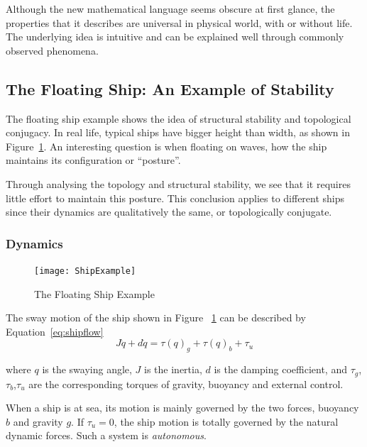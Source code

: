 Although the new mathematical language seems obscure at first glance, the properties that it describes are universal in physical world, with or without life.
The underlying idea is intuitive and can be explained well through commonly observed phenomena.



\subsection{The Floating Ship: An Example of Stability}
The floating ship  example shows the idea of structural stability and topological conjugacy.
In real life, typical ships have bigger height than width, as shown in Figure~\ref{fig:ShipFloating}.
An interesting  question is when floating on  waves, how the ship maintains its configuration or ``posture''.

Through analysing the topology and structural stability, we see that it requires little effort to maintain this posture.
This conclusion applies to different ships since their dynamics are qualitatively the same, or topologically conjugate.


\subsubsection*{Dynamics}

\begin{figure}[!htbp]
  \begin{center}
    \texttt{[image: ShipExample]}
    \caption{The Floating Ship Example}
    \label{fig:ShipFloating}
  \end{center}
\end{figure}

The sway motion of the ship shown in Figure ~\ref{fig:ShipFloating} can be described by Equation~\ref{eq:shipflow}
\begin{equation}
\label{eq:shipflow}
J\ddot{q}+d\dot{q}=\tau(q)_{g}+\tau(q)_{b}+\tau_{u}
\end{equation}


where $q$ is the swaying angle,
$J$ is the inertia,  
$d$ is the damping coefficient,
and $\tau_{g}$,$\tau_{b}$,$\tau_{u}$ are the corresponding torques of gravity, buoyancy and external control.

When a ship is at sea, its motion is mainly governed by the two forces,  buoyancy $b$ and gravity $g$.
If $\tau_{u}=0$,  the ship motion is totally governed by the natural dynamic forces.
Such a system is \emph{autonomous}.

